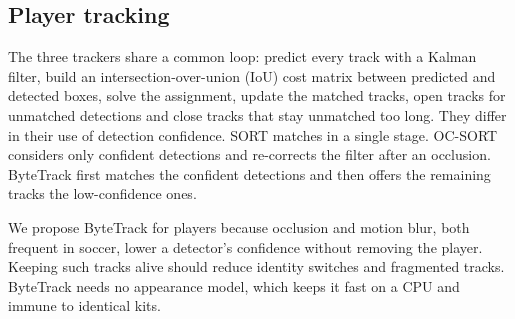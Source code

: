 \subsection{Player tracking}
The three trackers share a common loop: predict every track with a Kalman
filter, build an intersection-over-union (IoU) cost matrix between predicted and
detected boxes, solve the assignment, update the matched tracks, open tracks
for unmatched detections and close tracks that stay unmatched too long. They
differ in their use of detection confidence. SORT matches in a single stage.
OC-SORT considers only confident detections and re-corrects the filter after an
occlusion. ByteTrack first matches the confident detections and then offers the
remaining tracks the low-confidence ones.

We propose ByteTrack for players because occlusion and motion blur, both
frequent in soccer, lower a detector's confidence without removing the player.
Keeping such tracks alive should reduce identity switches and fragmented tracks.
ByteTrack needs no appearance model, which keeps it fast on a CPU and immune to
identical kits.

